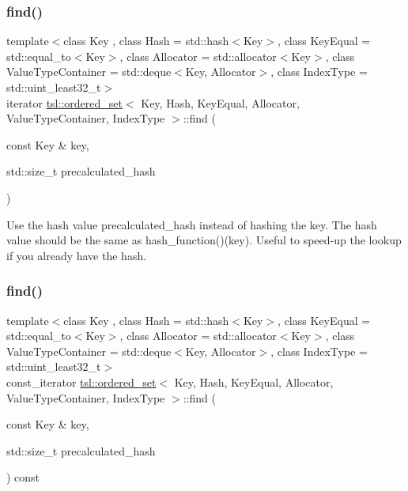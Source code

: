 \subsubsection{\texorpdfstring{find()}{find()}\hspace{0.1cm}{\footnotesize\ttfamily [1/6]}}
{\footnotesize\ttfamily template$<$class Key , class Hash  = std\+::hash$<$\+Key$>$, class Key\+Equal  = std\+::equal\+\_\+to$<$\+Key$>$, class Allocator  = std\+::allocator$<$\+Key$>$, class Value\+Type\+Container  = std\+::deque$<$\+Key, Allocator$>$, class Index\+Type  = std\+::uint\+\_\+least32\+\_\+t$>$ \\
iterator \mbox{\hyperlink{classtsl_1_1ordered__set}{tsl\+::ordered\+\_\+set}}$<$ Key, Hash, Key\+Equal, Allocator, Value\+Type\+Container, Index\+Type $>$\+::find (\begin{DoxyParamCaption}\item[{const Key \&}]{key,  }\item[{std\+::size\+\_\+t}]{precalculated\+\_\+hash }\end{DoxyParamCaption})\hspace{0.3cm}{\ttfamily [inline]}}

Use the hash value \textquotesingle{}precalculated\+\_\+hash\textquotesingle{} instead of hashing the key. The hash value should be the same as hash\+\_\+function()(key). Useful to speed-\/up the lookup if you already have the hash. \mbox{\label{classtsl_1_1ordered__set_aaef6331a007f7a8848b5dabc89238946}} 
\subsubsection{\texorpdfstring{find()}{find()}\hspace{0.1cm}{\footnotesize\ttfamily [2/6]}}
{\footnotesize\ttfamily template$<$class Key , class Hash  = std\+::hash$<$\+Key$>$, class Key\+Equal  = std\+::equal\+\_\+to$<$\+Key$>$, class Allocator  = std\+::allocator$<$\+Key$>$, class Value\+Type\+Container  = std\+::deque$<$\+Key, Allocator$>$, class Index\+Type  = std\+::uint\+\_\+least32\+\_\+t$>$ \\
const\+\_\+iterator \mbox{\hyperlink{classtsl_1_1ordered__set}{tsl\+::ordered\+\_\+set}}$<$ Key, Hash, Key\+Equal, Allocator, Value\+Type\+Container, Index\+Type $>$\+::find (\begin{DoxyParamCaption}\item[{const Key \&}]{key,  }\item[{std\+::size\+\_\+t}]{precalculated\+\_\+hash }\end{DoxyParamCaption}) const\hspace{0.3cm}{\ttfamily [inline]}}





